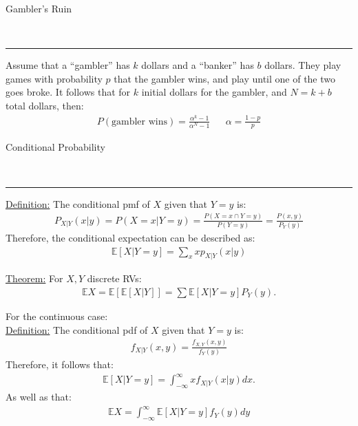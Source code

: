 \documentclass{article}
\newcommand{\header}[1]{\begin{large}\noindent #1\end{large}\\\rule{\textwidth}{0.5pt}}
\newcommand{\sheader}[1]{\underline{#1:}}
\newcommand{\gap}{\medskip\\}
\begin{document}
\pagebreak

\header{Gambler's Ruin}

Assume that a ``gambler'' has $k$ dollars and a ``banker'' has $b$ dollars.
They play games with probability $p$ that the gambler wins, and play 
until one of the two goes broke. It follows that for $k$ initial dollars
for the gambler, and $N = k + b$ total dollars, then:
\begin{align*}
    P(\textrm{gambler wins}) = \frac{\alpha^k - 1}{\alpha^N - 1} && \alpha = \frac{1-p}{p}
\end{align*}

\header{Conditional Probability}
\sheader{Definition} The conditional pmf of $X$ given that $Y=y$ is:
\begin{align*}
    P_{X|Y}(x | y) = P(X=x | Y=y) = \frac{P(X = x \cap Y = y)}{P(Y = y)} = \frac{P(x, y)}{P_Y(y)}
\end{align*}
Therefore, the conditional expectation can be described as:
\begin{align*}
    \mathbb{E}[X|Y = y] = \sum_{x}xp_{X|Y}(x|y)
\end{align*}

\sheader{Theorem} For $X, Y$ discrete RVs:
\begin{align*}
    \mathbb{E}X = \mathbb{E}\left[\mathbb{E}[X|Y]\right] = \sum \mathbb{E}\left[X | Y = y\right]P_Y(y).
\end{align*}

For the continuous case:
\gap
\sheader{Definition} The conditional pdf of $X$ given that $Y =y$ is:
\begin{align*}
    f_{X|Y}(x, y) = \frac{f_{X, Y}(x, y)}{f_Y(y)}
\end{align*}
Therefore, it follows that:
\begin{align*}
    \mathbb{E}[X|Y = y] = \int_{-\infty}^{\infty}xf_{X|Y}(x|y)dx.
\end{align*}
As well as that:
\begin{align*}
    \mathbb{E}X = \int_{-\infty}^{\infty}\mathbb{E}[X|Y=y]f_Y(y)dy
\end{align*}
\end{document}
